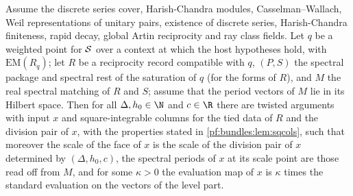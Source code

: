 \begin{lemma}\label{pf:bundles:lem:selreal}
Assume the discrete series cover, Harish-Chandra modules, Casselman--Wallach, Weil representations of unitary pairs, existence of discrete
series, Harish-Chandra finiteness, rapid decay, global Artin reciprocity and ray class fields. Let $q$ be a weighted point for $\mathcal S$ over a
context at which the host hypotheses hold, with $\mathrm{EM}(R_q)$; let $R$ be a reciprocity record compatible with $q$, $(P,S)$ the spectral
package and spectral rest of the saturation of $q$ (for the forms of $R$), and $M$ the real spectral matching of $R$ and $S$; assume that the
period vectors of $M$ lie in its Hilbert space. Then for all $\Delta,h_0\in\N$ and $c\in\R$ there are twisted arguments with input $x$ and
square-integrable columns for the tied data of $R$ and the division pair of $x$, with the properties stated in \cref{pf:bundles:lem:sqcols},
such that moreover the scale of the face of $x$ is the scale of the division pair of $x$ determined by $(\Delta,h_0,c)$, the spectral periods of
$x$ at its scale point are those read off from $M$, and for some $\kappa>0$ the evaluation map of $x$ is $\kappa$ times the standard evaluation
on the vectors of the level part.
\end{lemma}

